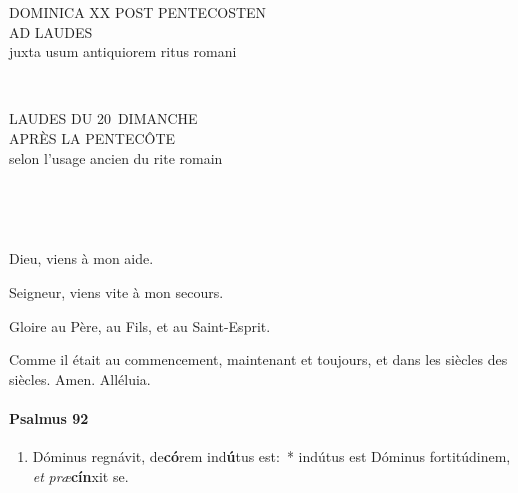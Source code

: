 \documentclass[twoside]{article}
\begin{document}
\null \newpage

\sloppy

\begin{paracol}[1]{2}

\begin{center}\begin{doublespace}

{
\MakeUppercase{\Large Dominica XX post Pentecosten \\ ad Laudes}\\
juxta usum antiquiorem ritus romani}
\end{doublespace}\end{center}


~~

\switchcolumn

\begin{center}\begin{doublespace}
{
\MakeUppercase{\Large Laudes du 20\ieme~dimanche \\ après la Pentecôte}\\
selon l'usage ancien du rite romain
}
\end{doublespace}\end{center}

~~

~~

\vv Dieu, viens à mon aide.

\rr Seigneur, viens vite à mon secours.

\vv Gloire au Père, au Fils, et au Saint-Esprit.

\rr Comme il était au commencement, maintenant et toujours, et dans les siècles des siècles. Amen. Alléluia.

\switchcolumn*

\paragraph{Psalmus 92}


\begin{enumerate}[wide, itemsep=0mm, labelwidth=!, labelindent=0pt, label=\color{gregoriocolor}\theenumi]
\item Dóminus regnávit, de\textbf{có}rem ind\textbf{ú}tus est:~* indútus est Dóminus fortitúdinem, \textit{et} \textit{præ}\textbf{cín}xit se.


\end{enumerate}
\end{paracol}
\end{document}
